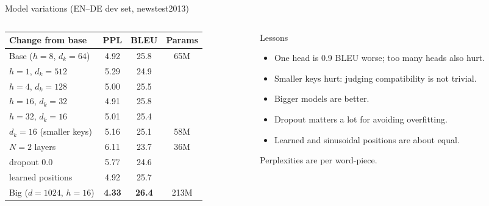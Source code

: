 \documentclass[aspectratio=169,11pt]{beamer}
\begin{document}
\begin{frame}{Model variations (EN--DE dev set, newstest2013)}
  \begin{columns}[T]
    \begin{column}{0.5\textwidth}
      \footnotesize
      \begin{tabular}{@{}lccc@{}}
        \toprule
        Change from base & PPL & BLEU & Params\\
        \midrule
        Base ($h=8$, $d_k=64$) & 4.92 & 25.8 & 65M\\
        $h=1$, $d_k=512$ & 5.29 & 24.9 & \\
        $h=4$, $d_k=128$ & 5.00 & 25.5 & \\
        $h=16$, $d_k=32$ & 4.91 & 25.8 & \\
        $h=32$, $d_k=16$ & 5.01 & 25.4 & \\
        $d_k=16$ (smaller keys) & 5.16 & 25.1 & 58M\\
        $N=2$ layers & 6.11 & 23.7 & 36M\\
        dropout 0.0 & 5.77 & 24.6 & \\
        learned positions & 4.92 & 25.7 & \\
        Big ($d=1024$, $h=16$) & \textbf{4.33} & \textbf{26.4} & 213M\\
        \bottomrule
      \end{tabular}
    \end{column}
    \begin{column}{0.46\textwidth}
      \begin{exampleblock}{Lessons}
        \small
        \begin{itemize}
          \item One head is 0.9 BLEU worse; too many heads also hurt.
          \item Smaller keys hurt: judging compatibility is not trivial.
          \item Bigger models are better.
          \item Dropout matters a lot for avoiding overfitting.
          \item Learned and sinusoidal positions are about equal.
        \end{itemize}
      \end{exampleblock}
      {\scriptsize Perplexities are per word-piece.}
    \end{column}
  \end{columns}
\end{frame}
\end{document}
